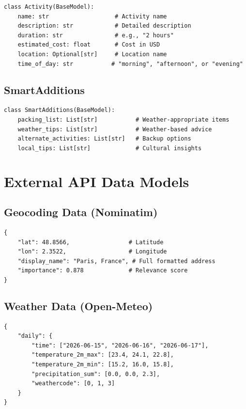 \documentclass[12pt,a4paper]{report}
\begin{document}
\begin{lstlisting}[style=pythonstyle, caption={Activity Schema}]
class Activity(BaseModel):
    name: str                   # Activity name
    description: str            # Detailed description
    duration: str               # e.g., "2 hours"
    estimated_cost: float       # Cost in USD
    location: Optional[str]     # Location name
    time_of_day: str           # "morning", "afternoon", or "evening"
\end{lstlisting}

\subsection{SmartAdditions}

\begin{lstlisting}[style=pythonstyle, caption={SmartAdditions Schema}]
class SmartAdditions(BaseModel):
    packing_list: List[str]           # Weather-appropriate items
    weather_tips: List[str]           # Weather-based advice
    alternate_activities: List[str]   # Backup options
    local_tips: List[str]             # Cultural insights
\end{lstlisting}

\section{External API Data Models}

\subsection{Geocoding Data (Nominatim)}

\begin{lstlisting}[style=jsonStyle, caption={Nominatim API Response}]
{
    "lat": 48.8566,                 # Latitude
    "lon": 2.3522,                  # Longitude
    "display_name": "Paris, France", # Full formatted address
    "importance": 0.878             # Relevance score
}
\end{lstlisting}

\subsection{Weather Data (Open-Meteo)}

\begin{lstlisting}[style=jsonStyle, caption={Open-Meteo API Response}]
{
    "daily": {
        "time": ["2026-06-15", "2026-06-16", "2026-06-17"],
        "temperature_2m_max": [23.4, 24.1, 22.8],
        "temperature_2m_min": [15.2, 16.0, 15.8],
        "precipitation_sum": [0.0, 0.0, 2.3],
        "weathercode": [0, 1, 3]
    }
}
\end{lstlisting}
\end{document}
